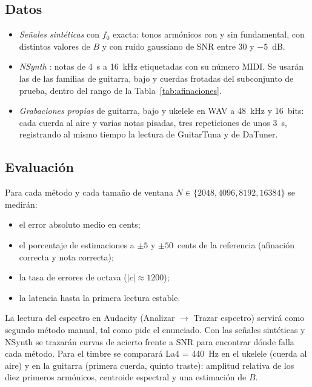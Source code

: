 \documentclass[conference,a4paper]{IEEEtran}
\newcommand{\fo}{f_0}
\begin{document}
\subsection{Datos}
\begin{itemize}
\item \emph{Señales sintéticas} con $\fo$ exacta: tonos armónicos con y sin fundamental, con distintos valores de $B$ y con ruido gaussiano de SNR entre 30 y $-5$~dB.
\item \emph{NSynth} \parencite{engel2017nsynth}: notas de 4~s a 16~kHz etiquetadas con su número MIDI. Se usarán las de las familias de guitarra, bajo y cuerdas frotadas del subconjunto de prueba, dentro del rango de la Tabla~\ref{tab:afinaciones}.
\item \emph{Grabaciones propias} de guitarra, bajo y ukelele en WAV a 48~kHz y 16~bits: cada cuerda al aire y varias notas pisadas, tres repeticiones de unos 3~s, registrando al mismo tiempo la lectura de GuitarTuna y de DaTuner.
\end{itemize}

\subsection{Evaluación}
Para cada método y cada tamaño de ventana $N\in\{2048,4096,8192,16384\}$ se medirán:
\begin{itemize}
\item el error absoluto medio en cents;
\item el porcentaje de estimaciones a $\pm5$ y $\pm50$~cents de la referencia (afinación correcta y nota correcta);
\item la tasa de errores de octava ($|c|\approx1200$);
\item la latencia hasta la primera lectura estable.
\end{itemize}
La lectura del espectro en Audacity (Analizar $\rightarrow$ Trazar espectro) servirá como segundo método manual, tal como pide el enunciado. Con las señales sintéticas y NSynth se trazarán curvas de acierto frente a SNR para encontrar dónde falla cada método. Para el timbre se comparará La4 = 440~Hz en el ukelele (cuerda al aire) y en la guitarra (primera cuerda, quinto traste): amplitud relativa de los diez primeros armónicos, centroide espectral y una estimación de $B$.

\printbibliography
\end{document}
